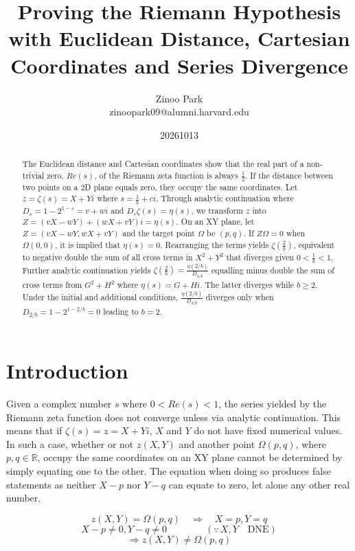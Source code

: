 \documentclass{amsart}
\title[RH Euclidean Cartesian]{Proving the Riemann Hypothesis \\
	with Euclidean Distance, Cartesian Coordinates and Series Divergence}
\author{Zinoo Park  \\ \MakeLowercase{zinoopark09@alumni.harvard.edu}}
\date{20261013}
\begin{document}
	
	\begin{abstract}
		The Euclidean distance and Cartesian coordinates show that the real part of a non-trivial zero, $Re(s)$, of the Riemann zeta function is always $\frac12$. If the distance between two points on a 2D plane equals zero, they occupy the same coordinates. Let $z=\zeta(s)=X+Yi$ where $s=\frac{1}{b}+ci$. Through analytic continuation where $D_{s}=1-2^{1-s}=v+wi$ and $D_{s}\zeta(s) = \eta(s)$, we transform $z$ into $Z = (vX-wY) + (wX+vY)i = \eta(s)$. On an XY plane, let $Z=(vX-wY, wX+vY)$ and the target point $\Omega$ be $(p, q)$. If $Z\Omega = 0$ when $\Omega(0,0)$, it is implied that $\eta(s)=0$. Rearranging the terms yields $\zeta(\frac{2}{b})$, equivalent to negative double the sum of all cross terms in $X^2 + Y^2$ that diverges given $0<\frac{1}{b}<1$. Further analytic continuation yields $\zeta(\frac{2}{b}) = \frac{\eta(2/b)}{D_{2/b}}$ equalling minus double the sum of cross terms from $G^2 + H^2$ where $\eta(s)= G + Hi$. The latter diverges while $b \geq 2$. Under the initial and additional conditions, $\frac{\eta(2/b)}{D_{2/b}}$ diverges only when $D_{2/b} = 1-2^{1-2/b} = 0$ leading to $b=2$.
	\end{abstract}
	
	\maketitle
	
	\section{Introduction}
	Given a complex number $s$ where $0<Re(s)<1$, the series yielded by the Riemann zeta function does not converge unless via analytic continuation. This means that if $\zeta(s) = z = X+Yi$, $X$ and $Y$ do not have fixed numerical values. In such a case, whether or not $z(X,Y)$ and another point $\Omega(p,q)$, where $p,q \in \mathbb{R}$, occupy the same coordinates on an XY plane cannot be determined by simply equating one to the other. The equation when doing so produces false statements as neither $X-p$ nor $Y-q$ can equate to zero, let alone any other real number.
	
	\[ z(X,Y) = \Omega(p,q) \quad \Rightarrow \quad X=p, Y=q \]
	\[ X-p \neq 0, Y -q \neq 0 \qquad\qquad (\because \, X, Y \quad \text{DNE}) \]
	\[ \Rightarrow z(X,Y) \neq \Omega(p,q) \]
	
\end{document}
